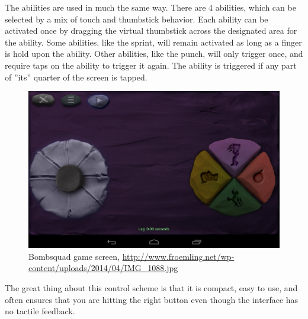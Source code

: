 The abilities are used in much the same way. 
There are 4 abilities, which can be selected by a mix of touch and thumbstick behavior. 
Each ability can be activated once by dragging the virtual thumbstick across the designated area for the ability. 
Some abilities, like the sprint, will remain activated as long as a finger is hold upon the ability. 
Other abilities, like the punch, will only trigger once, and require taps on the ability to trigger it again. 
The ability is triggered if any part of ''its'' quarter of the screen is tapped.

\begin{figure}[H]
\centering
\includegraphics[width=1\textwidth]{figures/controlscheme/onscreen_control}
\caption{Bombsquad game screen, \url{http://www.froemling.net/wp-content/uploads/2014/04/IMG_1088.jpg}}
\end{figure}

The great thing about this control scheme is that it is compact, easy to use, and often ensures that you are hitting the right button even though the interface has no tactile feedback.


